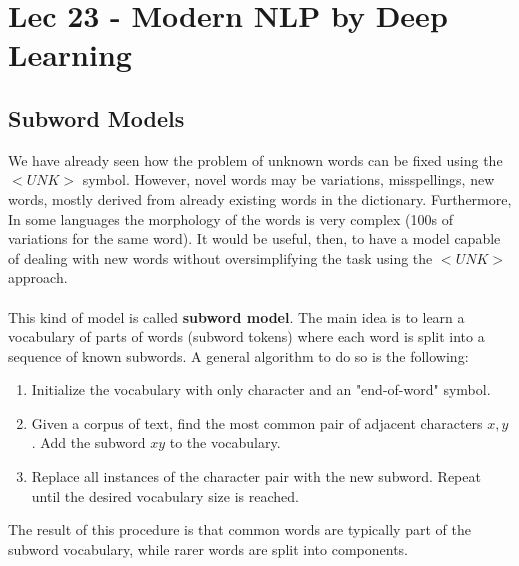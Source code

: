 \chapter{Lec 23 - Modern NLP by Deep Learning}
\section{Subword Models}
We have already seen how the problem of unknown words can be fixed using the $<UNK>$ symbol. However, novel words may be variations, misspellings, new words, mostly derived from already existing words in the dictionary. Furthermore, In some languages the morphology of the words is very complex (100s of variations for the same word). It would be useful, then, to have a model capable of dealing with new words without oversimplifying the task using the $<UNK>$ approach.\\\\
This kind of model is called \textbf{subword model}. The main idea is to learn a vocabulary of parts of words (subword tokens) where each word is split into a sequence of known subwords. A general algorithm to do so is the following:
\begin{enumerate}
    \item Initialize the vocabulary with only character and an "end-of-word" symbol.

    \item Given a corpus of text, find the most common pair of adjacent characters $x, y$. Add the subword $xy$ to the vocabulary.

    \item Replace all instances of the character pair with the new subword. Repeat until the desired vocabulary size is reached.
\end{enumerate}
The result of this procedure is that common words are typically part of the subword vocabulary, while rarer words are split into components.

